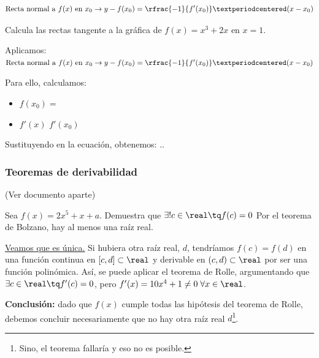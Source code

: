 \begin{mdframed}
	\begin{equation}
		\label{eq::rectatangente}
		\text{Recta normal a }f(x)\text{ en }x_0 \to y-f(x_0) = \rfrac{-1}{f'(x_0)}·(x-x_0)
	\end{equation}
\end{mdframed}

\begin{problem}
Calcula las rectas tangente a la gráfica de $f(x) = x^3+2x$ en $x=1$.
\solution

Aplicamos: $\text{Recta normal a }f(x)\text{ en }x_0 \to y-f(x_0) = \rfrac{-1}{f'(x_0)}·(x-x_0)$

Para ello, calculamos:
\begin{itemize}
	\item $f(x_0)=$
	\item $f'(x)$
	\subitem $f'(x_0)$
\end{itemize}
Sustituyendo en la ecuación, obtenemos:
.\vspace{2cm}.
\end{problem}



\subsubsection{Teoremas de derivabilidad}

(Ver documento aparte)

%
\begin{problem}
Sea $f(x) = 2x^5+x+a$.  Demuestra que $\exists!c\in\real\tq f(c)=0$
\solution
Por el teorema de Bolzano, hay al menos una raíz real.

\ul{Veamos que es única.} Si hubiera otra raíz real, $d$, tendríamos $f(c) = f(d)$ en una función continua en $[c,d]\subset\real$ y derivable en $(c,d)\subset\real$ por ser una función polinómica.
%
Así, se puede aplicar el teorema de Rolle, argumentando que $\exists c\in\real\tq f'(c) = 0$, pero $f'(x) = 10x^4+1 \neq 0 \;\forall x\in\real$.

\textbf{Conclusión: } dado que $f(x)$ cumple todas las hipótesis del teorema de Rolle, debemos concluir necesariamente que no hay otra raíz real $d$\footnote{Sino, el teorema fallaría y eso no es posible.}. 
\end{problem}


